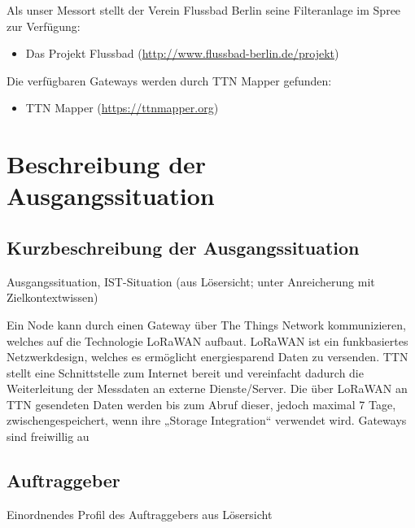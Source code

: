 \documentclass[
11pt,
a4paper,
ngerman,
]{article}
\newcommand{\descriptionWhat}[1]{%
	\begin{itshape}%
	#1 \\%
	\end{itshape}%
}
\begin{document}
Als unser Messort stellt der Verein Flussbad Berlin seine Filteranlage im Spree zur Verfügung:

\begin{itemize}[noitemsep]
	\item Das Projekt Flussbad (\url{http://www.flussbad-berlin.de/projekt})
\end{itemize}

Die verfügbaren Gateways werden durch TTN Mapper gefunden:

\begin{itemize}[noitemsep]
	\item TTN Mapper (\url{https://ttnmapper.org})
\end{itemize}

\newpage

\section{Beschreibung der Ausgangssituation}

\subsection{Kurzbeschreibung der Ausgangssituation}

\descriptionWhat{Ausgangssituation, IST-Situation (aus \glqq Lösersicht\grqq{}; unter Anreicherung mit \glqq Zielkontextwissen\grqq{})}

Ein Node kann durch einen Gateway über The Things Network kommunizieren, welches auf die Technologie LoRaWAN aufbaut. LoRaWAN ist ein funkbasiertes Netzwerkdesign, welches es ermöglicht energiesparend Daten zu versenden. TTN stellt eine Schnittstelle zum Internet bereit und vereinfacht dadurch die Weiterleitung der Messdaten an externe Dienste/Server. Die über LoRaWAN an TTN gesendeten Daten werden bis zum Abruf dieser, jedoch maximal 7 Tage, zwischengespeichert, wenn ihre „Storage Integration“ verwendet wird.
Gateways sind freiwillig au

\subsection{Auftraggeber}

\descriptionWhat{Einordnendes Profil des Auftraggebers aus \glqq Lösersicht\grqq{}}
\end{document}
